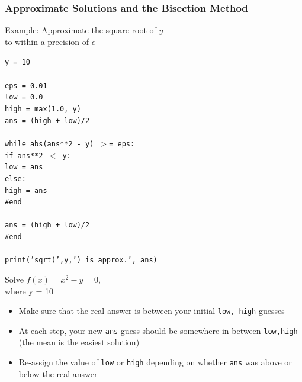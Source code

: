 \documentclass{beamer}
\newcommand{\code}[1]{\texttt{#1}}
\newcommand{\tab}{\hspace*{22pt}}
\begin{document}
\begin{frame}	
	\frametitle{Approximate Solutions and the Bisection Method}
	
	\begin{block}{Example:}
			Approximate the square root of $y$ \\ to within a precision of $\epsilon$
			
			\vspace{5pt}
			
			\begin{scriptsize}
			\code{y = 10 \\[-5pt]
			\tab \\[-5pt]
			eps = 0.01 \\[-5pt]
			low = 0.0 \\[-5pt]
			high = max(1.0, y) \\[-5pt]
			ans = (high + low)/2 \\[-5pt]
			\tab \\[-5pt]
			while abs(ans**2 - y) $>$= eps: \\[-5pt]
			\tab if ans**2 $<$ y: \\[-5pt]
			\tab \tab low = ans \\[-5pt]
			\tab else: \\[-5pt]
			\tab \tab high = ans \\[-5pt]
			\tab \#end \\[-5pt]
			\tab \\[-5pt]
			\tab ans = (high + low)/2 \\[-5pt]
			\#end \\[-5pt]
			\tab \\[-5pt]
			print('sqrt(',y,') is approx.', ans) 
			}
			\end{scriptsize}
		\endminipage\hfill
			Solve $f(x) = x^2 - y = 0$, \\ where y = 10
			\vspace{8pt}
			\begin{itemize}
				\item Make sure that the real answer is between your initial \code{low, high} guesses
				\item At each step, your new \code{ans} guess should be somewhere in between \code{low,high} (the mean is the easiest solution)
				\item Re-assign the value of \code{low} or \code{high} depending on whether \code{ans} was above or below the real answer
			\end{itemize}
		\endminipage\hfill
	\end{block}
	
\end{frame}
\end{document}

